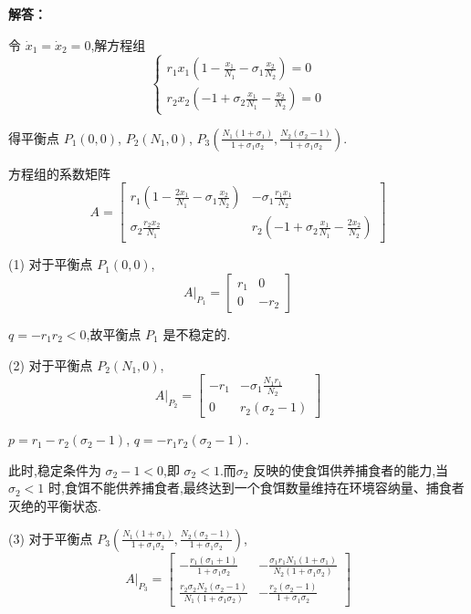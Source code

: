 \documentclass{article}
\begin{document}
\noindent\textbf{{\heiti 解答：}}

    令 $\dot{x}_1 = \dot{x}_2 = 0$,解方程组
    \[
    \begin{cases}
        r_1 x_1 \left( 1 - \frac{x_1}{N_1} - \sigma_1 \frac{x_2}{N_2} \right) = 0 \\
        r_2 x_2 \left( -1 + \sigma_2 \frac{x_1}{N_1} - \frac{x_2}{N_2} \right) = 0
    \end{cases}
    \]

    得平衡点 $P_1(0,0)$, $P_2(N_1, 0)$, $P_3(\frac{N_1(1+\sigma_1)}{1+\sigma_1\sigma_2},\frac{N_2(\sigma_2-1)}{1+\sigma_1\sigma_2})$.

    方程组的系数矩阵
    \[
    A = \begin{bmatrix}
        r_1 \left( 1 - \frac{2x_1}{N_1} - \sigma_1 \frac{x_2}{N_2} \right) & -\sigma_1 \frac{r_1 x_1}{N_2} \\
        \sigma_2 \frac{r_2 x_2}{N_1} & r_2 \left( -1 + \sigma_2 \frac{x_1}{N_1} - \frac{2x_2}{N_2} \right)
    \end{bmatrix}
    \]

    (1) 对于平衡点 $P_1(0,0)$,
    \[
    A|_{P_1} = \begin{bmatrix}
        r_1 & 0 \\
        0 & -r_2
    \end{bmatrix}
    \]

    $q=-r_1r_2 < 0$,故平衡点 $P_1$ 是不稳定的.

    (2) 对于平衡点 $P_2(N_1,0)$,
    \[
    A|_{P_2} = \begin{bmatrix}
        -r_1 & -\sigma_1 \frac{N_1r_1}{N_2} \\
        0 & r_2(\sigma_2-1)
    \end{bmatrix}
    \]

    $p=r_1-r_2(\sigma_2-1)$, $q=-r_1r_2(\sigma_2-1)$.

    此时,稳定条件为 $\sigma_2-1 < 0$,即 $\sigma_2 < 1$.而$\sigma_2$ 反映的使食饵供养捕食者的能力,当 $\sigma_2 < 1$ 时,食饵不能供养捕食者,最终达到一个食饵数量维持在环境容纳量、捕食者灭绝的平衡状态.

    (3) 对于平衡点 $P_3(\frac{N_1(1+\sigma_1)}{1+\sigma_1\sigma_2},\frac{N_2(\sigma_2-1)}{1+\sigma_1\sigma_2})$,
    \[
    A|_{P_3} = \begin{bmatrix}
        -\frac{r_1(\sigma_1 + 1)}{1+\sigma_1\sigma_2} & -\frac{\sigma_1r_1N_1(1+\sigma_1)}{N_2(1+\sigma_1\sigma_2)} \\
        \frac{r_2\sigma_2N_2(\sigma_2-1)}{N_1(1+\sigma_1\sigma_2)} & -\frac{r_2(\sigma_2-1)}{1+\sigma_1\sigma_2}
    \end{bmatrix}
    \]
\end{document}
